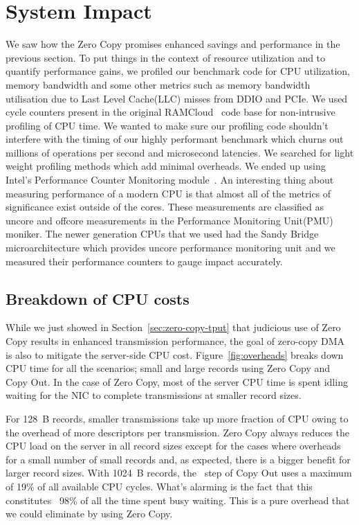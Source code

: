 \section{System Impact}
\label{sec:impact}

We saw how the Zero Copy promises enhanced savings and performance 
in the previous section. To put things in the context of resource utilization and
 to quantify performance gains, we profiled our benchmark code for CPU utilization, memory bandwidth 
 and some other metrics such as memory bandwidth utilisation due to Last Level Cache(LLC) misses from DDIO and PCIe.
We used cycle counters present in the original RAMCloud~\cite{ramcloud} code base for non-intrusive profiling 
of CPU time. We wanted to make sure our profiling code shouldn't interfere with the timing of our highly performant 
 benchmark which churns out millions of operations per second and microsecond latencies. 
 We searched for light weight profiling methods which add minimal overheads.
 We ended up using Intel\textregistered's Performance Counter Monitoring module~\cite{intelpcm}. 
 An interesting thing about measuring performance 
 of a modern CPU is that almost all of the metrics of significance exist outside of the cores. These measurements 
 are classified as uncore and offcore measurements in the Performance Monitoring Unit(PMU) moniker.
 The newer generation CPUs that we used had the Sandy Bridge microarchitecture which provides uncore performance 
 monitoring unit and we measured their performance counters to gauge impact accurately.


\subsection{Breakdown of CPU costs}
\label{sec:overhead}

While we just showed in Section~\ref{sec:zero-copy-tput} that judicious use of Zero Copy results 
in enhanced transmission performance, the goal of zero-copy DMA is also to 
mitigate the server-side CPU cost. Figure~\ref{fig:overheads} breaks down CPU time for 
all the scenarios; small and large records using Zero Copy and Copy Out. In the case 
of Zero Copy, most of the server CPU time is spent idling waiting for the NIC 
to complete transmissions at smaller record sizes.

 For 128~B records, smaller transmissions take up more fraction of CPU owing to the overhead of more descriptors
per transmission. Zero Copy always reduces the CPU load on the server in all record sizes except for the cases where
overheads for a small number of small records and, as expected, there is a bigger
benefit for larger record sizes. With 1024~B records, the \memcpy ~step of Copy Out uses a maximum of 19\% of all available
CPU cycles. What's alarming is the fact that this constitutes ~98\% of all the time spent busy waiting.
This is a pure overhead that we could eliminate by using Zero Copy.

